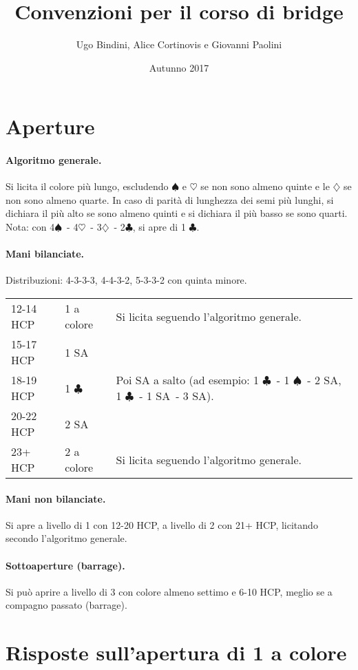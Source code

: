 \documentclass[a4paper,10pt]{article}
\title{Convenzioni per il corso di bridge}
\author{Ugo Bindini, Alice Cortinovis e Giovanni Paolini}
\date{Autunno 2017}
\renewcommand{\c}{$\clubsuit$\xspace}
\renewcommand{\d}{$\diamondsuit$\xspace}
\newcommand{\h}{$\heartsuit$\xspace}
\newcommand{\s}{$\spadesuit$\xspace}
\newcommand{\sa}{SA\xspace}
\newcommand{\smallspace}{\vskip0.3cm}
\newenvironment{threecol}
  {\smallspace\noindent\begin{tabular}{l l p{0.78\textwidth}}}
  {\end{tabular}\smallspace}
\begin{document}
\maketitle

\section{Aperture}

\paragraph{Algoritmo generale.}
Si licita il colore più lungo, escludendo \s e \h se non sono almeno quinte e le \d se non sono almeno quarte.
In caso di parità di lunghezza dei semi più lunghi, si dichiara il più alto se sono almeno quinti e si dichiara il più basso se sono quarti.
Nota: con 4\s\ - 4\h\ - 3\d\ - 2\c, si apre di 1 \c.

\paragraph{Mani bilanciate.} Distribuzioni: 4-3-3-3, 4-4-3-2, 5-3-3-2 con quinta minore.

\begin{threecol}
 12-14 HCP & 1 a colore & Si licita seguendo l'algoritmo generale.\\
 15-17 HCP & 1 \sa\\
 18-19 HCP & 1 \c & Poi \sa a salto (ad esempio: 1 \c\ - 1 \s\ - 2 \sa, 1 \c\ - 1 \sa\ - 3 \sa).\\
 20-22 HCP & 2 \sa\\
 23+ HCP & 2 a colore & Si licita seguendo l'algoritmo generale.
\end{threecol}

\paragraph{Mani non bilanciate.} Si apre a livello di 1 con 12-20 HCP, a livello di 2 con 21+ HCP, licitando secondo l'algoritmo generale.

\paragraph{Sottoaperture (barrage).} Si può aprire a livello di 3 con colore almeno settimo e 6-10 HCP, meglio se a compagno passato (barrage).

\section{Risposte sull'apertura di 1 a colore}
\end{document}
